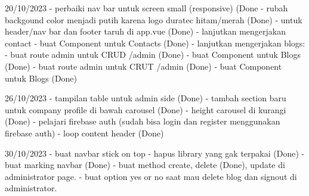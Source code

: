 20/10/2023
    - perbaiki nav bar untuk screen small (responsive) (Done
    - rubah backgound color menjadi putih karena logo duratec hitam/merah (Done)
    - untuk header/nav bar dan footer taruh di app.vue (Done)
    - lanjutkan mengerjakan contact
         - buat Component untuk Contacts (Done)
    - lanjutkan mengerjakan blogs:
        - buat route admin untuk CRUD   /admin (Done)
        - buat Component untuk Blogs (Done)
        - buat route admin untuk CRUT   /admin (Done)
        - buat Component untuk Blogs (Done)
    
26/10/2023
   - tampilan table untuk admin side (Done)
   - tambah section baru untuk company profile di bawah carousel (Done)
   - height carousel di kurangi (Done)
   - pelajari firebase auth (sudah bisa login dan register menggunakan firebase auth)
   - loop content header (Done)

30/10/2023
   - buat navbar stick on top
   - hapus library yang gak terpakai (Done)
   - buat marking navbar (Done)
   - buat method create, delete (Done), update di administrator page.
   - buat option yes or no saat mau delete blog dan signout di administrator.
